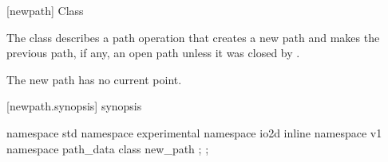  [newpath] {Class }

\pnum
{}
The class  describes a path operation that creates a new path and makes the previous path, if any, an open path unless it was closed by .

\pnum
The new path has no current point.

 [newpath.synopsis] { synopsis}

\begin{codeblock}
namespace std { namespace experimental { namespace io2d { inline namespace v1 {
  namespace path_data {
    class new_path {
    };
  };
} } } }
\end{codeblock}
